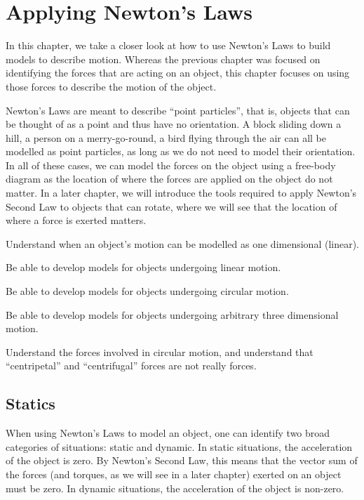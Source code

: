 
\chapter{Applying Newton's Laws}
\label{chap:ApplyingNewtonsLaws}
In this chapter, we take a closer look at how to use Newton's Laws to build models to describe motion. Whereas the previous chapter was focused on identifying the forces that are acting on an object, this chapter focuses on using those forces to describe the motion of the object.

Newton's Laws are meant to describe ``point particles'', that is, objects that can be thought of as a point and thus have no orientation. A block sliding down a hill, a person on a merry-go-round, a bird flying through the air can all be modelled as point particles, as long as we do not need to model their orientation. In all of these cases, we can model the forces on the object using a free-body diagram as the location of where the forces are applied on the object do not matter. In a later chapter, we will introduce the tools required to apply Newton's Second Law to objects that can rotate, where we will see that the location of where a force is exerted matters.

\vspace{1cm}
\begin{learningObjectives}
{
\item Understand when an object's motion can be modelled as one dimensional (linear).
\item Be able to develop models for objects undergoing linear motion.
\item Be able to develop models for objects undergoing circular motion.
\item Be able to develop models for objects undergoing arbitrary three dimensional motion.
\item Understand the forces involved in circular motion, and understand that ``centripetal'' and ``centrifugal'' forces are not really forces.
}
\end{learningObjectives}

\section{Statics}
When using Newton's Laws to model an object, one can identify two broad categories of situations: static and dynamic. In static situations, the acceleration of the object is zero. By Newton's Second Law, this means that the vector sum of the forces (and torques, as we will see in a later chapter) exerted on an object must be zero. In dynamic situations, the acceleration of the object is non-zero. 

